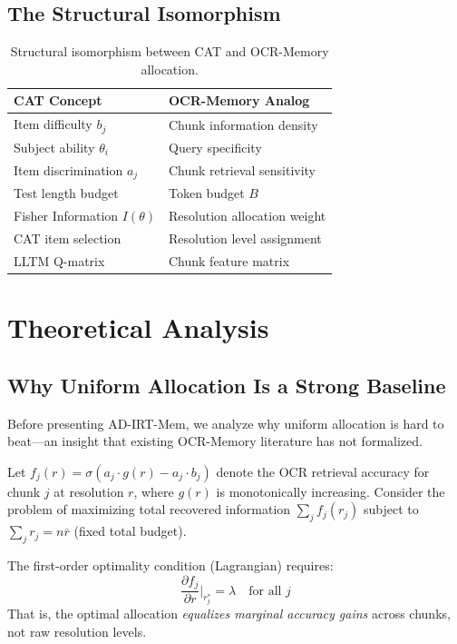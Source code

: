 \documentclass{article}
\begin{document}
\subsection{The Structural Isomorphism}

\begin{table}[ht!]
\centering
\caption{Structural isomorphism between CAT and OCR-Memory allocation.}
\label{tab:iso}
\begin{tabular}{ll}
\toprule
\textbf{CAT Concept} & \textbf{OCR-Memory Analog} \\
\midrule
Item difficulty $b_j$ & Chunk information density \\
Subject ability $\theta_i$ & Query specificity \\
Item discrimination $a_j$ & Chunk retrieval sensitivity \\
Test length budget & Token budget $B$ \\
Fisher Information $I(\theta)$ & Resolution allocation weight \\
CAT item selection & Resolution level assignment \\
LLTM Q-matrix & Chunk feature matrix \\
\bottomrule
\end{tabular}
\end{table}

\section{Theoretical Analysis}

\subsection{Why Uniform Allocation Is a Strong Baseline}

Before presenting AD-IRT-Mem, we analyze why uniform allocation is hard to beat---an insight that existing OCR-Memory literature has not formalized.

Let $f_j(r) = \sigma(a_j \cdot g(r) - a_j \cdot b_j)$ denote the OCR retrieval accuracy for chunk $j$ at resolution $r$, where $g(r)$ is monotonically increasing. Consider the problem of maximizing total recovered information $\sum_j f_j(r_j)$ subject to $\sum_j r_j = n\bar{r}$ (fixed total budget).

The first-order optimality condition (Lagrangian) requires:
\begin{equation}
\frac{\partial f_j}{\partial r}\bigg|_{r_j^*} = \lambda \quad \text{for all } j
\label{eq:marginal}
\end{equation}
That is, the optimal allocation \emph{equalizes marginal accuracy gains} across chunks, not raw resolution levels.
\end{document}
